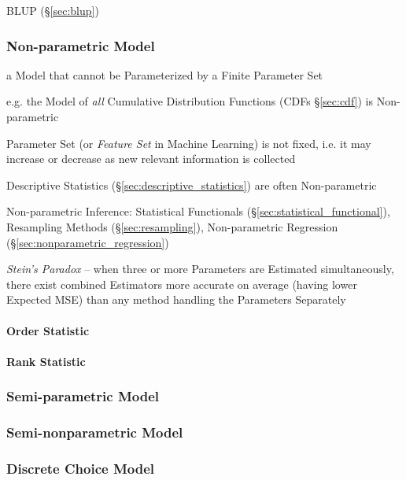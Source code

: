BLUP (\S\ref{sec:blup})



\subsubsection{Non-parametric Model}\label{sec:nonparametric_model}

a Model that cannot be Parameterized by a Finite Parameter Set

e.g. the Model of \emph{all} Cumulative Distribution Functions (CDFs
\S\ref{sec:cdf}) is Non-parametric

Parameter Set (or \emph{Feature Set} in Machine Learning) is not fixed, i.e. it
may increase or decrease as new relevant information is collected

Descriptive Statistics (\S\ref{sec:descriptive_statistics}) are often
Non-parametric

\fist Non-parametric Inference: Statistical Functionals
(\S\ref{sec:statistical_functional}), Resampling Methods
(\S\ref{sec:resampling}), Non-parametric Regression
(\S\ref{sec:nonparametric_regression})

\emph{Stein's Paradox} -- when three or more Parameters are Estimated
simultaneously, there exist combined Estimators more accurate on average (having
lower Expected MSE) than any method handling the Parameters Separately



\paragraph{Order Statistic}\label{sec:order_statistic}

\paragraph{Rank Statistic}\label{sec:rank_statistic}



\subsubsection{Semi-parametric Model}\label{sec:semiparametric_model}

\subsubsection{Semi-nonparametric Model}\label{sec:seminonparametric_model}

\subsubsection{Discrete Choice Model}\label{sec:discrete_choice_model}

